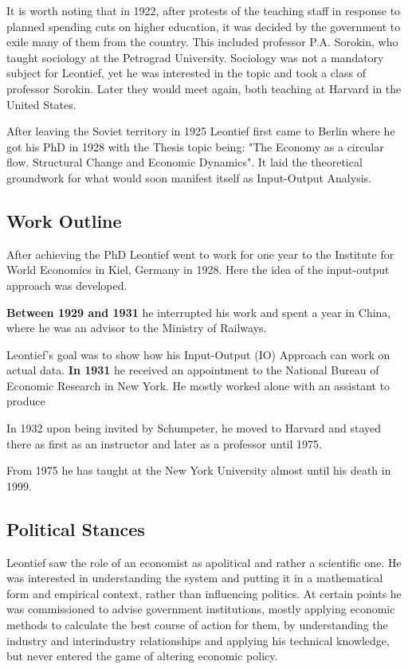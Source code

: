 \documentclass[12pt,a4paper]{scrartcl}
\begin{document}
	It is worth noting that in 1922, after protests of the teaching staff in response to planned spending cuts on higher education, it was decided by the government to exile many of them from the country. This included professor P.A. Sorokin, who taught sociology at the Petrograd University. Sociology was not a mandatory subject for Leontief, yet he was interested in the topic and took a class of professor Sorokin. Later they would meet again, both teaching at Harvard in the United States. \cite[p.353]{Kaliadina2006}
	
	After leaving the Soviet territory in 1925 Leontief first came to Berlin where he got his PhD in 1928 with the Thesis topic being: "The Economy as a circular flow. Structural Change and Economic Dynamics". It laid the theoretical groundwork for what would soon manifest itself as Input-Output Analysis.
	
	\subsection{Work Outline}
	
	After achieving the PhD Leontief went to work for one year to the Institute for World Economics in Kiel, Germany in 1928. Here the idea of the input-output approach was developed.
	
	\textbf{Between 1929 and 1931} he interrupted his work and spent a year in China, where he was an advisor to the Ministry of Railways.
	
	Leontief's goal was to show how his Input-Output (IO) Approach can work on actual data.	\textbf{In 1931} he received an appointment to the National Bureau of Economic Research in New York. He mostly worked alone with an assistant to produce
	
	In 1932 upon being invited by Schumpeter, he moved to Harvard and stayed there as first as an instructor and later as a professor until 1975. 
	
	From 1975 he has taught at the New York University almost until his death in 1999.
		
	\subsection{Political Stances}
	
	Leontief saw the role of an economist as apolitical and rather a scientific one. He was interested in understanding the system and putting it in a mathematical form and empirical context, rather than influencing politics. At certain points he was commissioned to advise government institutions, mostly applying economic methods to calculate the best course of action for them, by understanding the industry and interindustry relationships and applying his technical knowledge, but never entered the game of altering economic policy. \cite[p.21]{Hamilton2008}
	
\end{document}
